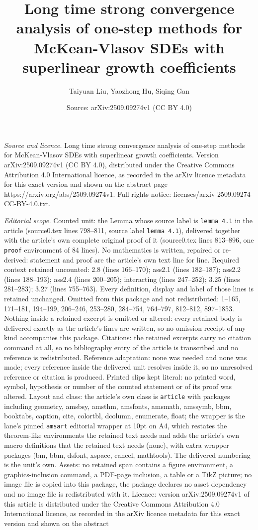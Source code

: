 \documentclass[10pt,a4paper]{amsart}
\title[Long time strong convergence analysis of one-step methods fo]{Long time strong convergence analysis of one-step methods for McKean-Vlasov SDEs with superlinear growth coefficients}
\author{Taiyuan Liu, Yaozhong Hu, Siqing Gan}
\date{Source: arXiv:2509.09274v1 (CC BY 4.0)}
\begin{document}
\maketitle

\noindent\emph{Source and licence.} Long time strong convergence analysis of one-step methods for McKean-Vlasov SDEs with superlinear growth coefficients. Version arXiv:2509.09274v1 (CC BY 4.0), distributed under the Creative Commons Attribution 4.0 International licence, as recorded in the arXiv licence metadata for this exact version and shown on the abstract page https://arxiv.org/abs/2509.09274v1. Full rights notice: licenses/arxiv-2509.09274-CC-BY-4.0.txt.\par\smallskip

\noindent\textit{Editorial scope.} Counted unit: the Lemma whose source label is \texttt{lemma 4.1} in the article (source0.tex lines 798--811, source label \texttt{lemma 4.1}), delivered together with the article's own complete original proof of it (source0.tex lines 813--896, one \texttt{proof} environment of 84 lines). No mathematics is written, repaired or re-derived: statement and proof are the article's own text line for line. Required context retained uncounted: 2.8 (lines 166--170); ass2.1 (lines 182--187); ass2.2 (lines 188--193); ass2.4 (lines 200--205); interacting (lines 247--252); 3.25 (lines 281--283); 3.27 (lines 755--763). Every definition, display and label of those lines is retained unchanged. Omitted from this package and not redistributed: 1--165, 171--181, 194--199, 206--246, 253--280, 284--754, 764--797, 812--812, 897--1853. Nothing inside a retained excerpt is omitted or altered: every retained body is delivered exactly as the article's lines are written, so no omission receipt of any kind accompanies this package. Citations: the retained excerpts carry no citation command at all, so no bibliography entry of the article is transcribed and no reference is redistributed. Reference adaptation: none was needed and none was made; every reference inside the delivered unit resolves inside it, so no unresolved reference or citation is produced. Printed slips kept literal: no printed word, symbol, hypothesis or number of the counted statement or of its proof was altered. Layout and class: the article's own class is \texttt{article} with packages including geometry, amsbsy, amsthm, amsfonts, amsmath, amssymb, bbm, booktabs, caption, cite, colortbl, dcolumn, enumerate, float; the wrapper is the lane's pinned \texttt{amsart} editorial wrapper at 10pt on A4, which restates the theorem-like environments the retained text needs and adds the article's own macro definitions that the retained text needs (none), with extra wrapper packages (bm, bbm, dsfont, xspace, cancel, mathtools). The delivered numbering is the unit's own. Assets: no retained span contains a figure environment, a graphics-inclusion command, a PDF-page inclusion, a table or a TikZ picture; no image file is copied into this package, the package declares no asset dependency and no image file is redistributed with it. Licence: version arXiv:2509.09274v1 of this article is distributed under the Creative Commons Attribution 4.0 International licence, as recorded in the arXiv licence metadata for this exact version and shown on the abstract 
\end{document}

